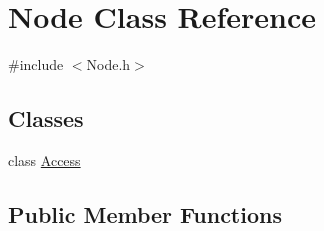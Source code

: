 \hypertarget{class_node}{}\section{Node Class Reference}
\label{class_node}


{\ttfamily \#include $<$Node.\+h$>$}

\subsection*{Classes}
\begin{DoxyCompactItemize}
\item 
class \hyperlink{class_node_1_1_access}{Access}
\end{DoxyCompactItemize}
\subsection*{Public Member Functions}
